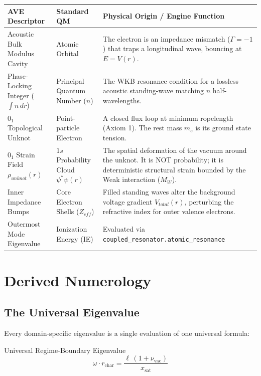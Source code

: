 \begin{center}
\renewcommand{\arraystretch}{1.5}
\begin{tabularx}{\textwidth}{@{}p{3.8cm}p{3.8cm}X@{}}
\toprule
\textbf{AVE Descriptor} & \textbf{Standard QM} & \textbf{Physical Origin / Engine Function} \\
\midrule
Acoustic Bulk Modulus Cavity & Atomic Orbital & The electron is an impedance mismatch ($\Gamma=-1$\gammaundeclared{}) that traps a longitudinal wave, bouncing at $E=V(r)$. \\
Phase-Locking Integer ($\int n\, dr$) & Principal Quantum Number ($n$) & The WKB resonance condition for a lossless acoustic standing-wave matching $n$ half-wavelengths. \\
$0_1$ Topological Unknot & Point-particle Electron & A closed flux loop at minimum ropelength (Axiom 1). The rest mass $m_e$ is its ground state tension. \\
$0_1$ Strain Field $\rho_{unknot}(r)$ & $1s$ Probability Cloud $\psi^*\psi(r)$ & The spatial deformation of the vacuum around the unknot. It is NOT probability; it is deterministic structural strain bounded by the Weak interaction ($M_W$). \\
Inner Impedance Bumps & Core Electron Shells ($Z_{eff}$) & Filled standing waves alter the background voltage gradient $V_{total}(r)$, perturbing the refractive index for outer valence electrons. \\
Outermost Mode Eigenvalue & Ionization Energy (IE) & Evaluated via \texttt{coupled\_resonator.atomic\_resonance} \\
\bottomrule
\end{tabularx}
\end{center}


\section{Derived Numerology}
\label{sec:qnm_numerology}

\subsection{The Universal Eigenvalue}

Every domain-specific eigenvalue is a single evaluation of one universal formula:

\begin{resultbox}{Universal Regime-Boundary Eigenvalue}
\begin{equation}
    \omega \cdot r_\mathrm{char} = \frac{\ell\,(1 + \nu_\mathrm{vac})}{x_\mathrm{sat}}
    \label{eq:universal_eigenvalue}
\end{equation}
\end{resultbox}


